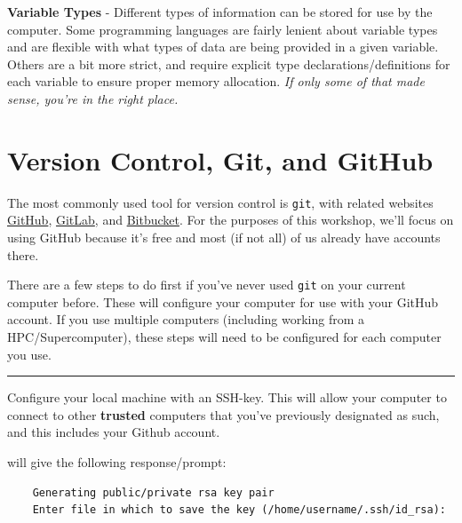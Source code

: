 \textbf{Variable Types} - Different types of information can be stored
for use by the computer. Some programming languages are fairly lenient
about variable types and are flexible with what types of data are being
provided in a given variable. Others are a bit more strict, and require
explicit type declarations/definitions for each variable to ensure
proper memory allocation. \emph{If only some of that made sense, you're
in the right place.}

\section{Version Control, Git, and GitHub}
The most commonly used tool for version control is \texttt{git}, with
related websites \href{https://www.github.com}{GitHub},
\href{https://about.gitlab.com/}{GitLab}, and
\href{https://bitbucket.org/}{Bitbucket}. For the purposes of this
workshop, we'll focus on using GitHub because it's free and most (if not
all) of us already have accounts there.

There are a few steps to do first if you've never used \texttt{git} on
your current computer before. These will configure your computer for use
with your GitHub account. If you use multiple computers (including
working from a HPC/Supercomputer), these steps will need to be
configured for each computer you use.

\begin{center}\rule{0.5\linewidth}{0.5pt}\end{center}

Configure your local machine with an SSH-key. This will allow your
computer to connect to other \textbf{trusted} computers that you've
previously designated as such, and this includes your Github account.

\begin{Shaded}
\begin{Highlighting}[]
     
\end{Highlighting}
\end{Shaded}

will give the following response/prompt:

\begin{verbatim}
    Generating public/private rsa key pair
    Enter file in which to save the key (/home/username/.ssh/id_rsa): 
\end{verbatim}


